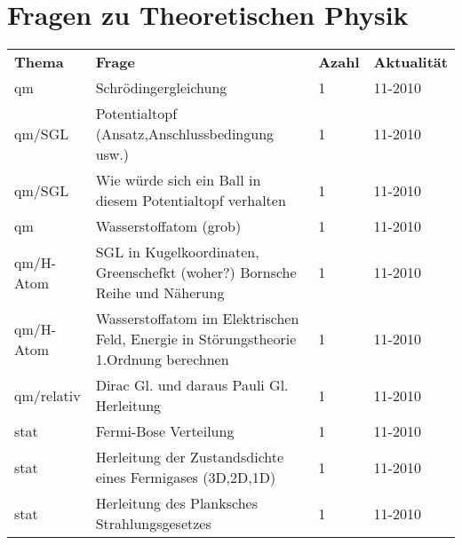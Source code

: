 



\section{Fragen zu Theoretischen Physik}

\begin{tabular}{lp{10cm}ll}
 \textbf{Thema}&\textbf{Frage}&\textbf{Azahl}&\textbf{Aktualität}\\
qm&Schrödingergleichung&1&11-2010\\
qm/SGL& Potentialtopf (Ansatz,Anschlussbedingung usw.)&1&11-2010\\
qm/SGL&Wie würde sich ein Ball in diesem Potentialtopf verhalten&1&11-2010\\
qm&Wasserstoffatom (grob)&1&11-2010\\
qm/H-Atom&SGL in Kugelkoordinaten, Greenschefkt (woher?) Bornsche Reihe und Näherung&1&11-2010\\
qm/H-Atom&Wasserstoffatom im Elektrischen Feld, Energie in Störungstheorie
1.Ordnung berechnen&1&11-2010\\
qm/relativ&Dirac Gl. und daraus Pauli Gl. Herleitung&1&11-2010\\
stat&Fermi-Bose Verteilung&1&11-2010\\
stat&Herleitung der Zustandsdichte eines Fermigases (3D,2D,1D)&1&11-2010\\
stat&Herleitung des Planksches Strahlungsgesetzes&1&11-2010\\



\end{tabular}




